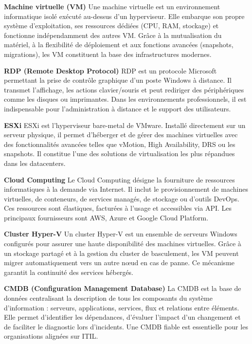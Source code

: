 \textbf{Machine virtuelle (VM)}
Une machine virtuelle est un environnement informatique isolé exécuté au-dessus d'un hyperviseur. Elle embarque son propre système d'exploitation, ses ressources dédiées (CPU, RAM, stockage) et fonctionne indépendamment des autres VM. Grâce à la mutualisation du matériel, à la flexibilité de déploiement et aux fonctions avancées (snapshots, migrations), les VM constituent la base des infrastructures modernes.

\textbf{RDP (Remote Desktop Protocol)}
RDP est un protocole Microsoft permettant la prise de contrôle graphique d'un poste Windows à distance. Il transmet l'affichage, les actions clavier/souris et peut rediriger des périphériques comme les disques ou imprimantes. Dans les environnements professionnels, il est indispensable pour l'administration à distance et le support des utilisateurs.

\textbf{ESXi}
ESXi est l'hyperviseur bare-metal de VMware. Installé directement sur un serveur physique, il permet d'héberger et de gérer des machines virtuelles avec des fonctionnalités avancées telles que vMotion, High Availability, DRS ou les snapshots. Il constitue l'une des solutions de virtualisation les plus répandues dans les datacenters.

\newpage

\textbf{Cloud Computing}
Le Cloud Computing désigne la fourniture de ressources informatiques à la demande via Internet. Il inclut le provisionnement de machines virtuelles, de conteneurs, de services managés, de stockage ou d'outils DevOps. Ces ressources sont élastiques, facturées à l'usage et accessibles via API. Les principaux fournisseurs sont AWS, Azure et Google Cloud Platform.

\textbf{Cluster Hyper-V}
Un cluster Hyper-V est un ensemble de serveurs Windows configurés pour assurer une haute disponibilité des machines virtuelles. Grâce à un stockage partagé et à la gestion du cluster de basculement, les VM peuvent migrer automatiquement vers un autre nœud en cas de panne. Ce mécanisme garantit la continuité des services hébergés.

\textbf{CMDB (Configuration Management Database)}
La CMDB est la base de données centralisant la description de tous les composants du système d'information : serveurs, applications, services, flux et relations entre éléments. Elle permet d'identifier les dépendances, d'évaluer l'impact d'un changement et de faciliter le diagnostic lors d'incidents. Une CMDB fiable est essentielle pour les organisations alignées sur ITIL.

